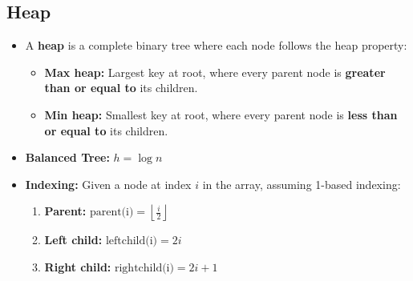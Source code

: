 \subsection{Heap}
\begin{summary}
    \begin{itemize}
        \item A \textbf{heap} is a complete binary tree where each node follows the heap property:
        \begin{itemize}
            \item \textbf{Max heap:} Largest key at root, where every parent node is \textbf{greater than or equal to} its children.
            \item \textbf{Min heap:} Smallest key at root, where every parent node is \textbf{less than or equal to} its children.
        \end{itemize}
        \item \textbf{Balanced Tree:} $h=\log n$
        \item \textbf{Indexing:} Given a node at index $i$ in the array, assuming 1-based indexing:
        \begin{enumerate}
            \item \textbf{Parent:} $\text{parent(i)} = \left \lfloor \frac{i}{2} \right \rfloor$
            \item \textbf{Left child:} $\text{leftchild(i)} = 2i$
            \item \textbf{Right child:} $\text{rightchild(i)} = 2i+1$
        \end{enumerate}
    \end{itemize}
\end{summary}


